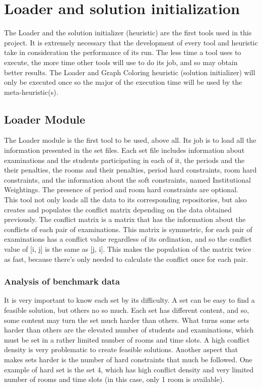 \chapter{Loader and solution initialization}
\label{implementation}
\thispagestyle{plain}

The Loader and the solution initializer (heuristic) are the first tools used in this project. It is extremely necessary that the development of every tool and heuristic take in consideration the performance of its run. The less time a tool uses to execute, the more time other tools will use to do its job, and so may obtain better results. The Loader and Graph Coloring heuristic (solution initializer) will only be executed once so the major of the execution time will be used by the meta-heuristic(s).

\section{Loader Module}

The Loader module is the first tool to be used, above all. Its job is to load all the information presented in the set files. Each set file includes information about examinations and the students participating in each of it, the periods and the their penalties, the rooms and their penalties, period hard constraints, room hard constraints, and the information about the soft constraints, named Institutional Weightings. The presence of period and room hard constraints are optional.\\

This tool not only loads all the data to its corresponding repositories, but also creates and populates the conflict matrix depending on the data obtained previously. The conflict matrix is a matrix that has the information about the conflicts of each pair of examinations. This matrix is symmetric, for each pair of examinations has a conflict value regardless of its ordination, and so the conflict value of [i, j] is the same as [j, i]. This makes the population of the matrix twice as fast, because there's only needed to calculate the conflict once for each pair.

\subsection{Analysis of benchmark data}

It is very important to know each set by its difficulty. A set can be easy to find a feasible solution, but others no so much. Each set has different content, and so, some content may turn the set much harder than others. What turns some sets harder than others are the elevated number of students and examinations, which must be set in a rather limited number of rooms and time slots. A high conflict density is very problematic to create feasible solutions. Another aspect that makes sets harder is the number of hard constraints that much be followed. One example of hard set is the set 4, which has high conflict density and very limited number of rooms and time slots (in this case, only 1 room is available).\\

